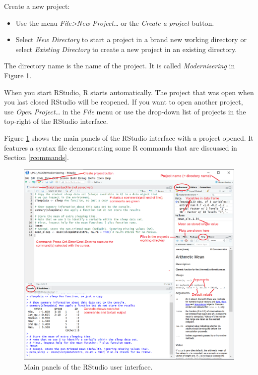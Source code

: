 \documentclass[doc,floatsintext]{apa6}
\providecommand{\tightlist}{%
  \setlength{\itemsep}{0pt}\setlength{\parskip}{0pt}}
\begin{document}
Create a new project:

\begin{itemize}
\tightlist
\item
  Use the menu \emph{File\textgreater{}New Project\ldots{}} or the
  \emph{Create a project} button.
\item
  Select \emph{New Directory} to start a project in a brand new working
  directory or select \emph{Existing Directory} to create a new project
  in an existing directory.
\end{itemize}

The directory name is the name of the project. It is called
\emph{Modernisering} in Figure \ref{fig:RStudio}.

When you start RStudio, R starts automatically. The project that was
open when you last closed RStudio will be reopened. If you want to open
another project, use \emph{Open Project\ldots{}} in the \emph{File} menu
or use the drop-down list of projects in the top-right of the RStudio
interface.

Figure \ref{fig:RStudio} shows the main panels of the RStudio interface
with a project opened. It features a syntax file demonstrating some R
commands that are discussed in Section \ref{rcommands}.

\begin{figure}[H]
\includegraphics[width=6.33in]{RStudio} \caption{Main panels of the RStudio user interface.}\label{fig:RStudio}
\end{figure}
\end{document}
